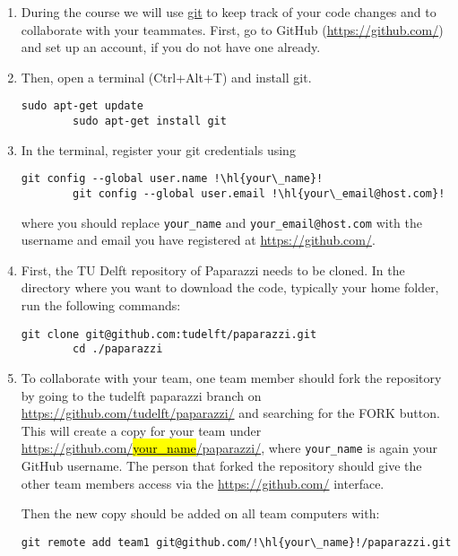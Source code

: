 \begin{enumerate}
	
	\item During the course we will use \href{https://git-scm.com/}{git} to keep track of your code changes and to collaborate with your teammates. First, go to GitHub (\url{https://github.com/}) and set up an account, if you do not have one already. 
	
	\item Then, open a terminal (Ctrl+Alt+T) and install git. 
	
	\begin{lstlisting}[style=Bash]
		sudo apt-get update
		sudo apt-get install git
	\end{lstlisting}

	\item In the terminal, register your git credentials using
	\begin{lstlisting}[style=Bash]
		git config --global user.name !\hl{your\_name}!
		git config --global user.email !\hl{your\_email@host.com}!
	\end{lstlisting}
	where you should replace \texttt{your\_name} and \texttt{your\_email@host.com} with the username and email you have registered at \url{https://github.com/}.

	\item First, the TU Delft repository of Paparazzi needs to be cloned. In the directory where you want to download the code, typically your home folder, run the following commands:

	\begin{lstlisting}[style=Bash]
		git clone git@github.com:tudelft/paparazzi.git
		cd ./paparazzi
	\end{lstlisting}

	\item To collaborate with your team, one team member should fork the repository by going to the tudelft paparazzi branch on \href{https://github.com/tudelft/paparazzi/}{https://github.com/tudelft/paparazzi/} and searching for the FORK button. This will create a copy for your team under \href{https://github.com/your_name/paparazzi/}{https://github.com/\hl{your\_name}/paparazzi/}, where \texttt{your\_name} is again your GitHub username. The person that forked the repository should give the other team members access via the \url{https://github.com/} interface.

	Then the new copy should be added on all team computers with:
	\begin{lstlisting}[style=Bash]
		git remote add team1 git@github.com/!\hl{your\_name}!/paparazzi.git
	\end{lstlisting}


\end{enumerate}
